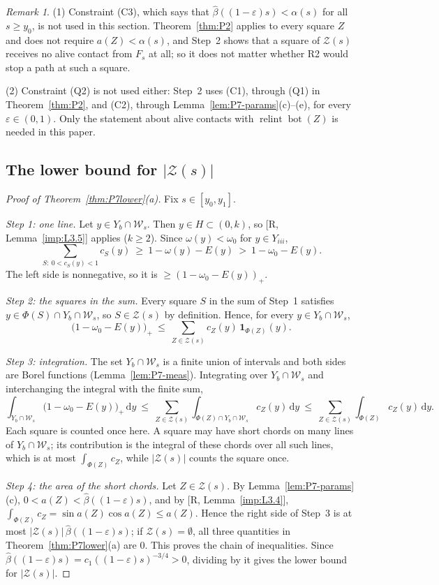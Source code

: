\documentclass[11pt]{amsart}
\newcommand{\eps}{\varepsilon}
\newcommand{\cZ}{\mathcal Z}
\newcommand{\relint}{\operatorname{relint}}
\newcommand{\Bot}{\operatorname{bot}}
\newcommand{\Fs}{F_{s}}
\newcommand{\dd}{\,\mathrm d}
\theoremstyle{definition}
\theoremstyle{remark}
\newtheorem{remark}[theorem]{Remark}
\numberwithin{equation}{section}
\begin{document}
\begin{remark}\label{rem:P7-C3}
(1) Constraint (C3), which says that $\hat\beta((1-\eps)s)<\alpha(s)$ for all $s\ge y_0$, is not used in this section. Theorem~\ref{thm:P2} applies to every square $Z$ and does not require $a(Z)<\alpha(s)$, and Step~2 shows that a square of $\cZ(s)$ receives no alive contact from $\Fs$ at all; so it does not matter whether R2 would stop a path at such a square.

(2) Constraint (Q2) is not used either: Step~2 uses (C1), through (Q1) in Theorem~\ref{thm:P2}, and (C2), through Lemma~\ref{lem:P7-params}(c)--(e), for every $\eps\in(0,1)$. Only the statement about alive contacts with $\relint\Bot(Z)$ is needed in this paper.
\end{remark}

\subsection{The lower bound for \texorpdfstring{$|\cZ(s)|$}{|Z(s)|}}\label{ssec:P7-proofB}

\begin{proof}[Proof of Theorem~\ref{thm:P7lower}(a)]
Fix $s\in[y_0,y_1]$.

\emph{Step 1: one line.} Let $y\in Y_b\cap\mathcal W_s$. Then $y\in H\subset(0,k)$, so [R, Lemma~\ref{imp:L3.5}] applies ($k\ge2$). Since $\omega(y)<\omega_0$ for $y\in Y_{iii}$,
\[
\sum_{S:\ 0<c_S(y)<1}c_S(y)\ \ge\ 1-\omega(y)-E(y)\ >\ 1-\omega_0-E(y).
\]
The left side is nonnegative, so it is $\ge(1-\omega_0-E(y))_+$.

\emph{Step 2: the squares in the sum.} Every square $S$ in the sum of Step~1 satisfies $y\in\Phi(S)\cap Y_b\cap\mathcal W_s$, so $S\in\cZ(s)$ by definition. Hence, for every $y\in Y_b\cap\mathcal W_s$,
\[
\big(1-\omega_0-E(y)\big)_+\ \le\ \sum_{Z\in\cZ(s)}c_Z(y)\,\mathbf 1_{\Phi(Z)}(y).
\]

\emph{Step 3: integration.} The set $Y_b\cap\mathcal W_s$ is a finite union of intervals and both sides are Borel functions (Lemma~\ref{lem:P7-meas}). Integrating over $Y_b\cap\mathcal W_s$ and interchanging the integral with the finite sum,
\[
\int_{Y_b\cap\mathcal W_s}\big(1-\omega_0-E(y)\big)_+\dd y\ \le\ \sum_{Z\in\cZ(s)}\int_{\Phi(Z)\cap Y_b\cap\mathcal W_s}c_Z(y)\dd y\ \le\ \sum_{Z\in\cZ(s)}\int_{\Phi(Z)}c_Z(y)\dd y .
\]
Each square is counted once here. A square may have short chords on many lines of $Y_b\cap\mathcal W_s$; its contribution is the integral of these chords over all such lines, which is at most $\int_{\Phi(Z)}c_Z$, while $|\cZ(s)|$ counts the square once.

\emph{Step 4: the area of the short chords.} Let $Z\in\cZ(s)$. By Lemma~\ref{lem:P7-params}(c), $0<a(Z)<\hat\beta((1-\eps)s)$, and by [R, Lemma~\ref{imp:L3.4}], $\int_{\Phi(Z)}c_Z=\sin a(Z)\cos a(Z)\le a(Z)$. Hence the right side of Step~3 is at most $|\cZ(s)|\,\hat\beta((1-\eps)s)$; if $\cZ(s)=\emptyset$, all three quantities in Theorem~\ref{thm:P7lower}(a) are $0$. This proves the chain of inequalities. Since $\hat\beta((1-\eps)s)=c_1((1-\eps)s)^{-3/4}>0$, dividing by it gives the lower bound for $|\cZ(s)|$.
\end{proof}
\end{document}
